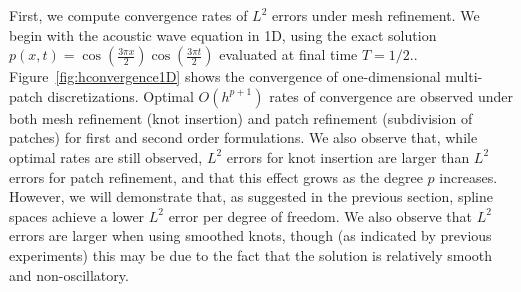 \documentclass[preprint,10pt]{elsarticle}
\newcommand{\LRp}[1]{\left( #1 \right)}
\begin{document}
First, we compute convergence rates of $L^2$ errors under mesh refinement.  We begin with the acoustic wave equation in 1D, using the exact solution $p(x,t) = \cos\LRp{\frac{3\pi x}{2}}\cos\LRp{\frac{3\pi t}{2}}$ evaluated at final time $T=1/2$..  Figure~\ref{fig:hconvergence1D} shows the convergence of one-dimensional multi-patch discretizations.  Optimal $O(h^{p+1})$ rates of convergence are observed under both mesh refinement (knot insertion) and patch refinement (subdivision of patches) for first and second order formulations.  We also observe that, while optimal rates are still observed, $L^2$ errors for knot insertion are larger than $L^2$ errors for patch refinement, and that this effect grows as the degree $p$ increases.  However, we will demonstrate that, as suggested in the previous section, spline spaces achieve a lower $L^2$ error per degree of freedom.  We also observe that $L^2$ errors are larger when using smoothed knots, though (as indicated by previous experiments) this may be due to the fact that the solution is relatively smooth and non-oscillatory.  
\end{document}
